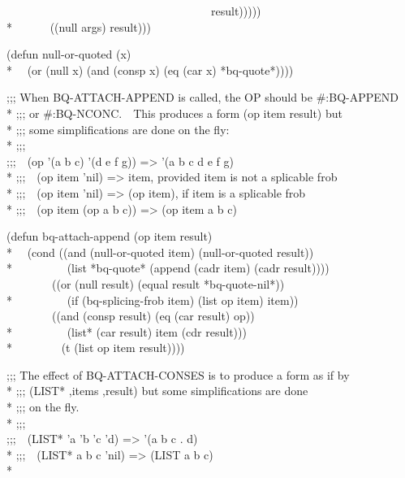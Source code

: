 \begin{new}
\begin{lisp}
~~~~~~~~~~~~~~~~~~~~~~~~~~~~~~~~~~~~result))))) \\*
~~~~~~((null args) result)))
\end{lisp}
\begin{lisp}
(defun null-or-quoted (x) \\*
~~(or (null x) (and (consp x) (eq (car x) *bq-quote*))))
\end{lisp}
\begin{lisp}
;;; When BQ-ATTACH-APPEND is called, the OP should be \#:BQ-APPEND \\*
;;; or \#:BQ-NCONC.~~This produces a form (op item result) but \\*
;;; some simplifications are done on the fly: \\*
;;; \\
;;;~~(op '(a b c) '(d e f g)) => '(a b c d e f g) \\*
;;;~~(op item 'nil) => item, provided item is not a splicable frob \\*
;;;~~(op item 'nil) => (op item), if item is a splicable frob \\*
;;;~~(op item (op a b c)) => (op item a b c)
\end{lisp}
\begin{lisp}
(defun bq-attach-append (op item result) \\*
~~(cond ((and (null-or-quoted item) (null-or-quoted result)) \\*
~~~~~~~~~(list *bq-quote* (append (cadr item) (cadr result)))) \\
~~~~~~~~((or (null result) (equal result *bq-quote-nil*)) \\*
~~~~~~~~~(if (bq-splicing-frob item) (list op item) item)) \\
~~~~~~~~((and (consp result) (eq (car result) op)) \\*
~~~~~~~~~(list* (car result) item (cdr result))) \\*
~~~~~~~~(t (list op item result))))
\end{lisp}
\begin{lisp}
;;; The effect of BQ-ATTACH-CONSES is to produce a form as if by \\*
;;; {\Xbq}(LIST* ,{\Xatsign}items ,result) but some simplifications are done \\*
;;; on the fly. \\*
;;; \\
;;;~~(LIST* 'a 'b 'c 'd) => '(a b c . d) \\*
;;;~~(LIST* a b c 'nil) => (LIST a b c) \\*

\end{lisp}
\end{new}
